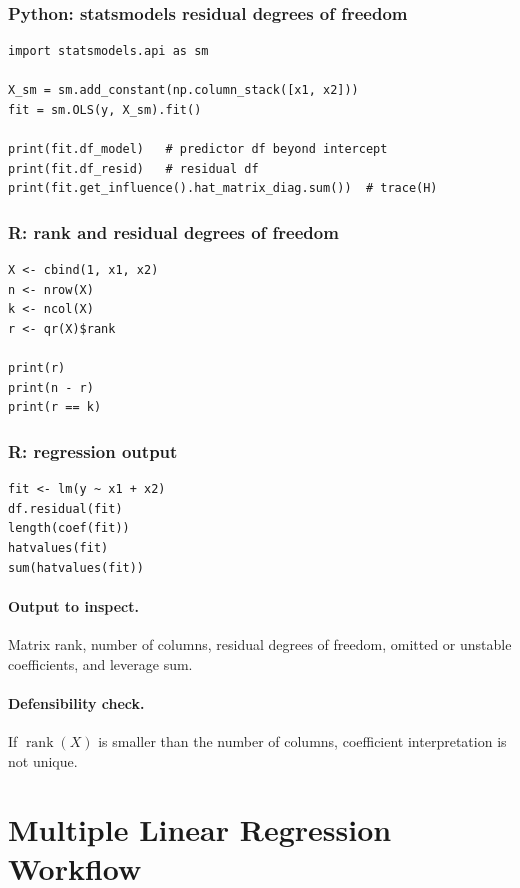 \subsubsection*{Python: statsmodels residual degrees of freedom}

\begin{verbatim}
import statsmodels.api as sm

X_sm = sm.add_constant(np.column_stack([x1, x2]))
fit = sm.OLS(y, X_sm).fit()

print(fit.df_model)   # predictor df beyond intercept
print(fit.df_resid)   # residual df
print(fit.get_influence().hat_matrix_diag.sum())  # trace(H)
\end{verbatim}

\subsubsection*{R: rank and residual degrees of freedom}

\begin{verbatim}
X <- cbind(1, x1, x2)
n <- nrow(X)
k <- ncol(X)
r <- qr(X)$rank

print(r)
print(n - r)
print(r == k)
\end{verbatim}

\subsubsection*{R: regression output}

\begin{verbatim}
fit <- lm(y ~ x1 + x2)
df.residual(fit)
length(coef(fit))
hatvalues(fit)
sum(hatvalues(fit))
\end{verbatim}

\paragraph{Output to inspect.} Matrix rank, number of columns, residual degrees of freedom, omitted or unstable coefficients, and leverage sum.

\paragraph{Defensibility check.} If \(\operatorname{rank}(X)\) is smaller than the number of columns, coefficient interpretation is not unique.

\section{Multiple Linear Regression Workflow}
\label{app:cookbook-multiple-linear-regression}


